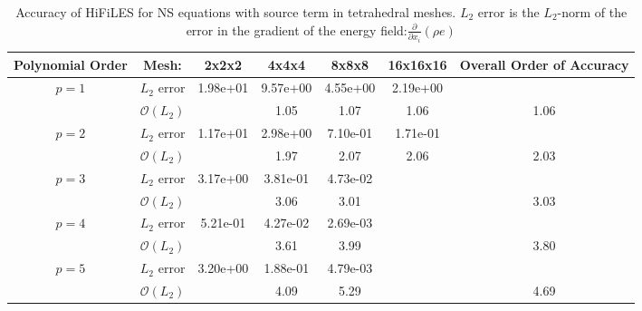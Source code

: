 \begin{table}[H]
\centering
\begin{tabular}{ c c c c c c c} 
  
 Polynomial Order & Mesh: & 2x2x2 & 4x4x4 & 8x8x8 & 16x16x16 & Overall Order of Accuracy \\ 
 \hline 
 \multirow{2}{*}{$p = 1$} & $L_2$ error & 1.98e+01 & 9.57e+00 & 4.55e+00 & 2.19e+00 &   \\ 
  
   & $\mathcal{O}(L_2)$ &   & 1.05 & 1.07 & 1.06 & 1.06 \\ 
 \hline 
 \multirow{2}{*}{$p = 2$} & $L_2$ error & 1.17e+01 & 2.98e+00 & 7.10e-01 & 1.71e-01 &   \\ 
  
   & $\mathcal{O}(L_2)$ &   & 1.97 & 2.07 & 2.06 & 2.03 \\ 
 \hline 
 \multirow{2}{*}{$p = 3$} & $L_2$ error & 3.17e+00 & 3.81e-01 & 4.73e-02 &   &   \\ 
  
   & $\mathcal{O}(L_2)$ &   & 3.06 & 3.01 &   & 3.03 \\ 
 \hline 
 \multirow{2}{*}{$p = 4$} & $L_2$ error & 5.21e-01 & 4.27e-02 & 2.69e-03 &   &   \\ 
  
   & $\mathcal{O}(L_2)$ &   & 3.61 & 3.99 &   & 3.80 \\ 
 \hline 
 \multirow{2}{*}{$p = 5$} & $L_2$ error & 3.20e+00 & 1.88e-01 & 4.79e-03 &   &   \\ 
  
   & $\mathcal{O}(L_2)$ &   & 4.09 & 5.29 &   & 4.69 \\ 
 \hline 
 \end{tabular}
\caption{Accuracy of HiFiLES for NS equations with source term in tetrahedral meshes. $L_2$ error is the $L_2$-norm of the error in the gradient of the energy field:$\frac{\partial}{\partial x_i} (\rho e)$}
\label{table:tetsError2} 
 \end{table}
